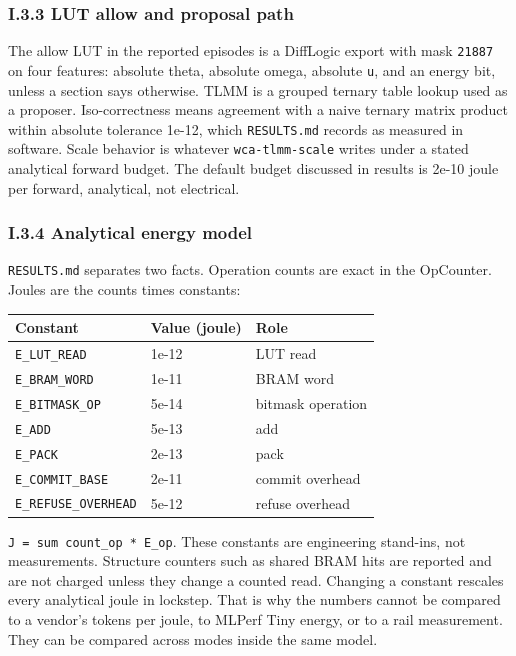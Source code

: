 \documentclass[
  10pt,
]{article}
\newcounter{none} %
\begin{document}
\subsubsection{I.3.3 LUT allow and proposal
path}\label{i.3.3-lut-allow-and-proposal-path}

The allow LUT in the reported episodes is a DiffLogic export with mask
\texttt{21887} on four features: absolute theta, absolute omega,
absolute \texttt{u}, and an energy bit, unless a section says otherwise.
TLMM is a grouped ternary table lookup used as a proposer.
Iso-correctness means agreement with a naive ternary matrix product
within absolute tolerance 1e-12, which \texttt{RESULTS.md} records as
measured in software. Scale behavior is whatever \texttt{wca-tlmm-scale}
writes under a stated analytical forward budget. The default budget
discussed in results is 2e-10 joule per forward, analytical, not
electrical.

\subsubsection{I.3.4 Analytical energy
model}\label{i.3.4-analytical-energy-model}

\texttt{RESULTS.md} separates two facts. Operation counts are exact in
the OpCounter. Joules are the counts times constants:

{\def\LTcaptype{none} %
\begin{longtable}[]{@{}lll@{}}
\toprule\noalign{}
Constant & Value (joule) & Role \\
\midrule\noalign{}
\endhead
\bottomrule\noalign{}
\endlastfoot
\texttt{E\_LUT\_READ} & 1e-12 & LUT read \\
\texttt{E\_BRAM\_WORD} & 1e-11 & BRAM word \\
\texttt{E\_BITMASK\_OP} & 5e-14 & bitmask operation \\
\texttt{E\_ADD} & 5e-13 & add \\
\texttt{E\_PACK} & 2e-13 & pack \\
\texttt{E\_COMMIT\_BASE} & 2e-11 & commit overhead \\
\texttt{E\_REFUSE\_OVERHEAD} & 5e-12 & refuse overhead \\
\end{longtable}
}

\texttt{J\ =\ sum\ count\_op\ *\ E\_op}. These constants are engineering
stand-ins, not measurements. Structure counters such as shared BRAM hits
are reported and are not charged unless they change a counted read.
Changing a constant rescales every analytical joule in lockstep. That is
why the numbers cannot be compared to a vendor's tokens per joule, to
MLPerf Tiny energy, or to a rail measurement. They can be compared
across modes inside the same model.
\end{document}
